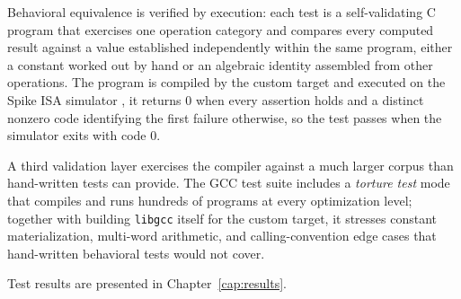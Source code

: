 Behavioral equivalence is verified by execution: each test is a self-validating C program that
exercises one operation category and compares every computed result against a value established
independently within the same program, either a constant worked out by hand or an algebraic identity
assembled from other operations. The program is compiled by the custom target and executed on the
Spike ISA simulator \cite{spike}, it returns 0 when every assertion holds and a distinct nonzero code
identifying the first failure otherwise, so the test passes when the simulator exits with code 0.

A third validation layer exercises the compiler against a much larger corpus than hand-written tests
can provide. The GCC test suite includes a \textit{torture test} mode that compiles and runs hundreds
of programs at every optimization level; together with building \texttt{libgcc} itself for the custom
target, it stresses constant materialization, multi-word arithmetic, and calling-convention edge cases
that hand-written behavioral tests would not cover.

Test results are presented in Chapter~\ref{cap:results}.
